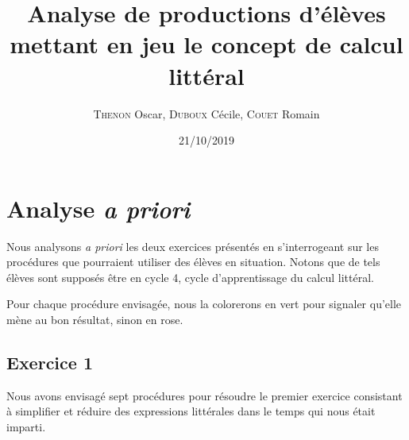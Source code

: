 \documentclass{report}
\title{Analyse de productions d'élèves mettant en jeu le concept de calcul littéral}
\author{ \textsc{Thenon} Oscar, \textsc{Duboux} Cécile, \textsc{Couet} Romain}
\date{21/10/2019}
\theoremstyle{definition}
\begin{document}
\maketitle

\section*{Analyse \textit{a priori}}


Nous analysons \textit{a priori} les deux exercices présentés en s'interrogeant sur les procédures que pourraient utiliser des élèves en situation. Notons que de tels élèves sont supposés être en cycle 4, cycle d'apprentissage du calcul littéral.

Pour chaque procédure envisagée, nous la colorerons en vert pour signaler qu'elle mène au bon résultat, sinon en rose.

\subsection*{Exercice 1}

Nous avons envisagé sept procédures pour résoudre le premier exercice consistant à simplifier et réduire des expressions littérales dans le temps qui nous était imparti. 
\end{document}

